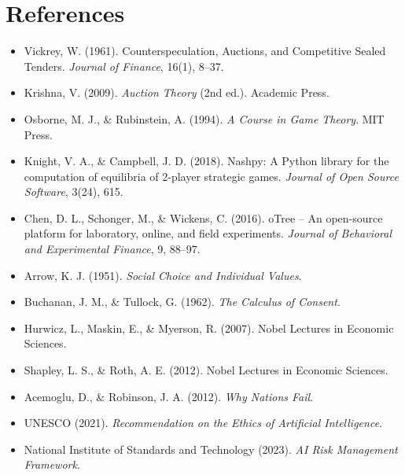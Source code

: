 \documentclass[11pt]{article}
\begin{document}
\section{References}
\begin{itemize}[leftmargin=*]
  \item Vickrey, W. (1961). Counterspeculation, Auctions, and Competitive Sealed Tenders. \emph{Journal of Finance}, 16(1), 8--37.
  \item Krishna, V. (2009). \emph{Auction Theory} (2nd ed.). Academic Press.
  \item Osborne, M. J., \& Rubinstein, A. (1994). \emph{A Course in Game Theory}. MIT Press.
  \item Knight, V. A., \& Campbell, J. D. (2018). Nashpy: A Python library for the computation of equilibria of 2-player strategic games. \emph{Journal of Open Source Software}, 3(24), 615.
  \item Chen, D. L., Schonger, M., \& Wickens, C. (2016). oTree -- An open-source platform for laboratory, online, and field experiments. \emph{Journal of Behavioral and Experimental Finance}, 9, 88--97.
  \item Arrow, K. J. (1951). \emph{Social Choice and Individual Values}.
  \item Buchanan, J. M., \& Tullock, G. (1962). \emph{The Calculus of Consent}.
  \item Hurwicz, L., Maskin, E., \& Myerson, R. (2007). Nobel Lectures in Economic Sciences.
  \item Shapley, L. S., \& Roth, A. E. (2012). Nobel Lectures in Economic Sciences.
  \item Acemoglu, D., \& Robinson, J. A. (2012). \emph{Why Nations Fail}.
  \item UNESCO (2021). \emph{Recommendation on the Ethics of Artificial Intelligence}.
  \item National Institute of Standards and Technology (2023). \emph{AI Risk Management Framework}.
\end{itemize}
\end{document}
